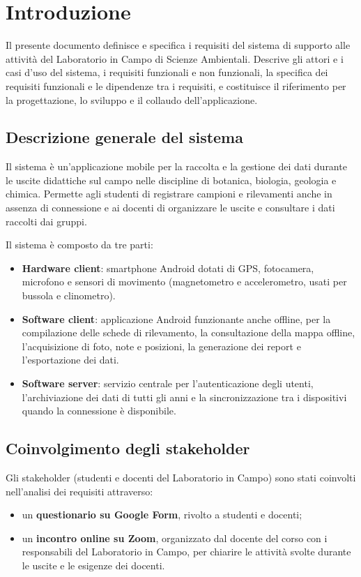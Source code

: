 \section{Introduzione}

Il presente documento definisce e specifica i requisiti del sistema di supporto alle attività del Laboratorio in Campo di Scienze Ambientali. Descrive gli attori e i casi d'uso del sistema, i requisiti funzionali e non funzionali, la specifica dei requisiti funzionali e le dipendenze tra i requisiti, e costituisce il riferimento per la progettazione, lo sviluppo e il collaudo dell'applicazione.

\subsection{Descrizione generale del sistema}
Il sistema è un'applicazione mobile per la raccolta e la gestione dei dati durante le uscite didattiche sul campo nelle discipline di botanica, biologia, geologia e chimica. Permette agli studenti di registrare campioni e rilevamenti anche in assenza di connessione e ai docenti di organizzare le uscite e consultare i dati raccolti dai gruppi.

Il sistema è composto da tre parti:
\begin{itemize}
    \item \textbf{Hardware client}: smartphone Android dotati di GPS, fotocamera, microfono e sensori di movimento (magnetometro e accelerometro, usati per bussola e clinometro).
    \item \textbf{Software client}: applicazione Android funzionante anche offline, per la compilazione delle schede di rilevamento, la consultazione della mappa offline, l'acquisizione di foto, note e posizioni, la generazione dei report e l'esportazione dei dati.
    \item \textbf{Software server}: servizio centrale per l'autenticazione degli utenti, l'archiviazione dei dati di tutti gli anni e la sincronizzazione tra i dispositivi quando la connessione è disponibile.
\end{itemize}

\subsection{Coinvolgimento degli stakeholder}
Gli stakeholder (studenti e docenti del Laboratorio in Campo) sono stati coinvolti nell'analisi dei requisiti attraverso:
\begin{itemize}
    \item un \textbf{questionario su Google Form}, rivolto a studenti e docenti;
    \item un \textbf{incontro online su Zoom}, organizzato dal docente del corso con i responsabili del Laboratorio in Campo, per chiarire le attività svolte durante le uscite e le esigenze dei docenti.
\end{itemize}

